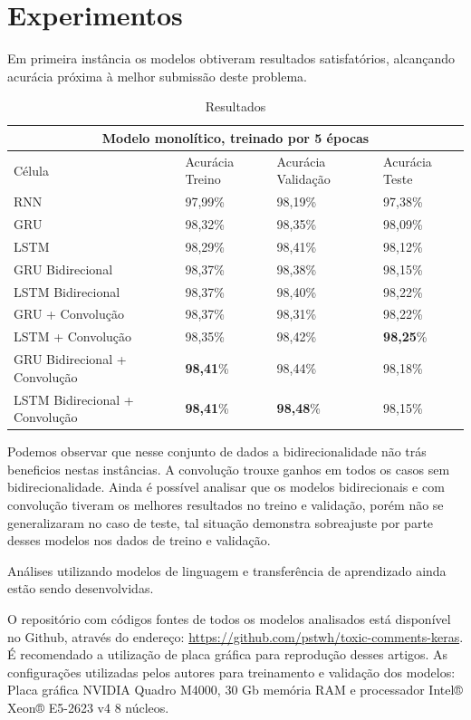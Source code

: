 \documentclass[12pt]{article}
\begin{document}
\section{Experimentos}

Em primeira instância os modelos obtiveram resultados satisfatórios, alcançando acurácia próxima à melhor submissão deste problema.

\begin{table}[!htb]
  \small
  \centering
  \renewcommand{\arraystretch}{1.15}
  \begin{tabular}{llll}
      \hline
      \multicolumn{4}{c}{Modelo monolítico, treinado por 5 épocas} \\
      \hline
    \hline
     Célula & Acurácia Treino & Acurácia Validação & Acurácia Teste \\
    RNN & 97,99\% & 98,19\% & 97,38\% \\
    GRU & 98,32\% & 98,35\% & 98,09\% \\
    LSTM & 98,29\% & 98,41\% & 98,12\% \\
    GRU Bidirecional & 98,37\% & 98,38\% & 98,15\% \\
    LSTM Bidirecional & 98,37\% & 98,40\% & 98,22\% \\
    GRU + Convolução & 98,37\% & 98,31\% & 98,22\% \\
    LSTM + Convolução & 98,35\% & 98,42\% & \textbf{98,25}\% \\
    GRU Bidirecional + Convolução & \textbf{98,41}\% & 98,44\% & 98,18\% \\
    LSTM Bidirecional + Convolução & \textbf{98,41}\% & \textbf{98,48}\% & 98,15\% \\
    \hline
  \end{tabular}
  \caption{Resultados}
  \label{tab:ptb}
\end{table}


Podemos observar que nesse conjunto de dados a bidirecionalidade não trás beneficios nestas instâncias. A convolução trouxe ganhos em todos os casos sem bidirecionalidade. Ainda é possível analisar que os modelos bidirecionais e com convolução tiveram os melhores resultados no treino e validação, porém não se generalizaram no caso de teste, tal situação demonstra sobreajuste por parte desses modelos nos dados de treino e validação.

Análises utilizando modelos de linguagem e transferência de aprendizado ainda estão sendo desenvolvidas.

O repositório com códigos fontes de todos os modelos analisados está disponível no Github, através do endereço: \url{https://github.com/pstwh/toxic-comments-keras}. É recomendado a utilização de placa gráfica para reprodução desses artigos. As configurações utilizadas pelos autores para treinamento e validação dos modelos: Placa gráfica NVIDIA Quadro M4000, 30 Gb memória RAM e processador Intel® Xeon® E5-2623 v4 8 núcleos.
\end{document}
